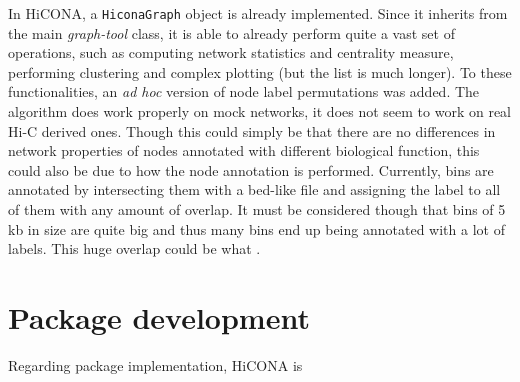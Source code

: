 In HiCONA, a \texttt{HiconaGraph} object is already implemented. Since it inherits from the main \textit{graph-tool} class, it is able to already perform quite a vast set of operations, such as computing network statistics and centrality measure, performing clustering and complex plotting (but the list is much longer). To these functionalities, an \textit{ad hoc} version of node label permutations was added. The algorithm does work properly on mock networks, it does not seem to work on real Hi-C derived ones. Though this could simply be that there are no differences in network properties of nodes annotated with different biological function, this could also be due to how the node annotation is performed. Currently, bins are annotated by intersecting them with a bed-like file and assigning the label to all of them with any amount of overlap. It must be considered though that bins of 5 kb in size are quite big and thus many bins end up being annotated with a lot of labels. This huge overlap could be what . 




\section{Package development}

Regarding package implementation, HiCONA is 